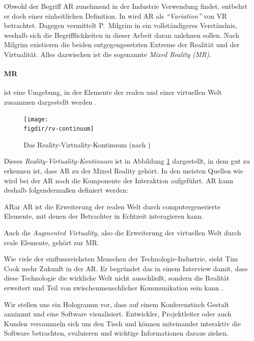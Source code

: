 Obwohl der Begriff AR zunehmend in der Industrie Verwendung findet, entbehrt er doch einer einheitlichen Definition. In \cite{azuma1997survey} wird AR als \emph{"`Variation"'} von VR betrachtet. Dagegen vermittelt P.\ Milgrim in \cite{milgram1995augmented} ein vollständigeres Verständnis, weshalb sich die Begrifflichkeiten in dieser Arbeit daran anlehnen sollen. Nach Milgrim existieren die beiden entgegengesetzten Extreme der Realität und der Virtualität. Alles dazwischen ist die sogenannte \emph{Mixed Reality (MR)}.

\paragraph{MR} ist eine Umgebung, in der Elemente der realen und einer virtuellen Welt zusammen dargestellt werden \cite{kato1999marker}.\\

\begin{figure}[htb]
  \texttt{[image: \\figdir/rv-continuum]}
  \caption{Das Reality-Virtuality-Kontinuum (nach \cite{milgram1995augmented})}
  \label{fig:rv-continuum}
\end{figure}

Dieses \emph{Reality-Virtuality-Kontinuum} ist in Abbildung \ref{fig:rv-continuum} dargestellt, in dem gut zu erkennen ist, dass AR zu der Mixed Reality gehört. In den meisten Quellen wie \cite{azuma1997survey, azuma2001recent, kato1999marker} wird bei der AR noch die Komponente der Interaktion aufgeführt. AR kann deshalb folgendermaßen definiert werden:

\begin{defbox}{AR}{ar}
   AR ist die Erweiterung der realen Welt durch computergenerierte Elemente, mit denen der Betrachter in Echtzeit interagieren kann.
\end{defbox}

Auch die \emph{Augmented Virtuality}, also die Erweiterung der virtuellen Welt durch reale Elemente, gehört zur MR.

Wie viele der einflussreichsten Menschen der Technologie-Industrie, sieht Tim Cook mehr Zukunft in der AR. Er begründet das in einem Interview damit, dass diese Technologie die wirkliche Welt nicht ausschließt, sondern die Realität erweitert und Teil von zwischenmenschlicher Kommunikation sein kann \cite{theindependent2017apple}.

Wir stellen uns ein Hologramm vor, dass auf einem Konferenztisch Gestalt annimmt und eine Software visualisiert. Entwickler, Projektleiter oder auch Kunden versammeln sich um den Tisch und können miteinander interaktiv die Software betrachten, evaluieren und wichtige Informationen daraus ziehen.

